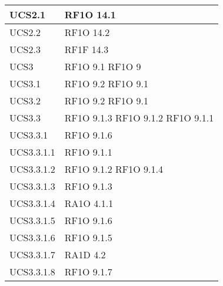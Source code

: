 \begin{center}
\begin{longtable}{ | p{5cm} | p{5cm} |}
            UCS2.1 &  RF1O 14.1 \newline  \\ \hline      
            UCS2.2 &  RF1O 14.2 \newline  \\ \hline      
            UCS2.3 &  RF1F 14.3 \newline  \\ \hline      
            UCS3 &  RF1O 9.1  \newline  RF1O 9  \newline  \\ \hline      
            UCS3.1 &  RF1O 9.2 \newline  RF1O 9.1  \newline  \\ \hline      
            UCS3.2 &  RF1O 9.2 \newline  RF1O 9.1  \newline  \\ \hline      
            UCS3.3 &  RF1O 9.1.3  \newline  RF1O 9.1.2  \newline  RF1O 9.1.1  \newline  \\ \hline      
            UCS3.3.1 &  RF1O 9.1.6 \newline  \\ \hline      
            UCS3.3.1.1 &  RF1O 9.1.1  \newline  \\ \hline      
            UCS3.3.1.2 &  RF1O 9.1.2  \newline  RF1O 9.1.4  \newline  \\ \hline      
            UCS3.3.1.3 &  RF1O 9.1.3  \newline  \\ \hline      
            UCS3.3.1.4 &  RA1O 4.1.1  \newline  \\ \hline      
            UCS3.3.1.5 &  RF1O 9.1.6 \newline  \\ \hline      
            UCS3.3.1.6 &  RF1O 9.1.5 \newline  \\ \hline      
            UCS3.3.1.7 &  RA1D 4.2  \newline  \\ \hline      
            UCS3.3.1.8 &  RF1O 9.1.7 \newline  \\ \hline      

\end{longtable}
\end{center}
